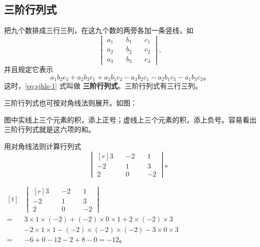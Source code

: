\subsection{三阶行列式}\label{subsec:4-2}

把九个数排成三行三列，在这九个数的两旁各加一条竖线，如
\begin{equation}
    \begin{vmatrix}
        a_1 \quad & b_1 \quad & c_1 \\
        a_2 \quad & b_2 \quad & c_2 \\
        a_3 \quad & b_3 \quad & c_3
    \end{vmatrix}, \label{eq:sjhls-1}
\end{equation}
并且规定它表示
\begin{equation}
    a_1b_2c_3 + a_2b_3c_1 + a_3b_1c_2 - a_3b_2c_1 - a_2b_1c_3 - a_1b_3c_2 \text{。} \label{eq:sjhls-2}
\end{equation}
这时，\eqref{eq:sjhls-1} 式叫做 \textbf{三阶行列式}。三阶行列式有三行三列。

三阶行列式也可按对角线法则展开。如图：

\begin{figure}[H]
    \centering
    
\end{figure}


图中实线上三个元素的积，添上正号；虚线上三个元素的积，添上负号。容易看出三阶行列式就是这六项的和。

\liti 用对角线法则计算行列式
$$\begin{vmatrix*}[r]
    3 \quad & -2 \quad & 1 \\
    -2 \quad & 1 \quad & 3 \\
    2 \quad & 0 \quad & -2
\end{vmatrix*} \text{。} $$

\jie $\begin{aligned}[t]
    & \begin{vmatrix*}[r]
        3 \quad & -2 \quad & 1 \\
        -2 \quad & 1 \quad & 3 \\
        2 \quad & 0 \quad & -2
    \end{vmatrix*} \\
    ={} & 3 \times 1 \times (-2) + (-2) \times 0 \times 1 + 2 \times (-2) \times 3 \\
        & -2 \times 1 \times 1 - (-2) \times (-2) \times (-2) - 3 \times 0 \times 3 \\
    ={} & -6 + 0 -12 - 2 + 8 - 0 = -12 \text{。}
\end{aligned}$


